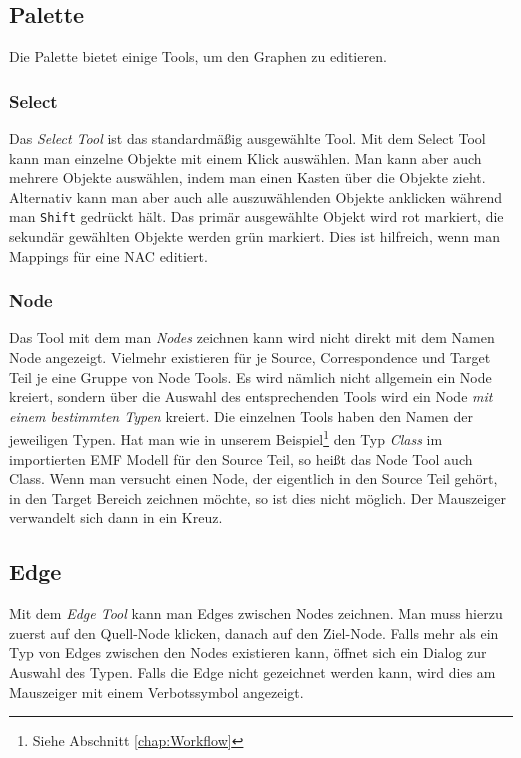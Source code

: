 \subsection{Palette}
Die Palette bietet einige Tools, um den Graphen zu editieren.

\subsubsection{Select}
\label{subsubsec:Graph_View-Select}
Das \emph{Select Tool} ist das standardmäßig ausgewählte Tool. Mit dem Select Tool kann man einzelne Objekte mit einem Klick auswählen. Man kann aber auch mehrere Objekte auswählen, indem man einen Kasten über die Objekte zieht. Alternativ kann man aber auch alle auszuwählenden Objekte anklicken während man \texttt{Shift} gedrückt hält. Das primär ausgewählte Objekt wird rot markiert, die sekundär gewählten Objekte werden grün markiert. Dies ist hilfreich, wenn man Mappings für eine NAC editiert.

\subsubsection{Node}
\label{subsubsec:Graph_View-Node}
Das Tool mit dem man \emph{Nodes} zeichnen kann wird nicht direkt mit dem Namen Node angezeigt. Vielmehr existieren für je Source, Correspondence und Target Teil je eine Gruppe von Node Tools. Es wird nämlich nicht allgemein ein Node kreiert, sondern über die Auswahl des entsprechenden Tools wird ein Node \textit{mit einem bestimmten Typen} kreiert. Die einzelnen Tools haben den Namen der jeweiligen Typen. Hat man wie in unserem Beispiel\footnote{Siehe Abschnitt \ref{chap:Workflow}} den Typ \emph{Class} im importierten EMF Modell für den Source Teil, so heißt das Node Tool auch Class. Wenn man versucht einen Node, der eigentlich in den Source Teil gehört, in den Target Bereich zeichnen möchte, so ist dies nicht möglich. Der Mauszeiger verwandelt sich dann in ein Kreuz.

\subsection{Edge}
\label{subsubsec:Graph_View-Edge}
Mit dem \emph{Edge Tool} kann man Edges zwischen Nodes zeichnen. Man muss hierzu zuerst auf den Quell-Node klicken, danach auf den Ziel-Node. Falls mehr als ein Typ von Edges zwischen den Nodes existieren kann, öffnet sich ein Dialog zur Auswahl des Typen. Falls die Edge nicht gezeichnet werden kann, wird dies am Mauszeiger mit einem Verbotssymbol angezeigt.

